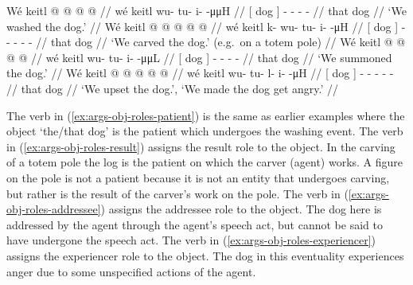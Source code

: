 \pex\label{exx:args-obj-roles}%
\a\label{ex:args-obj-roles-patient}%
%
\begingl
	\gla	{} Wé keitl {}  @ {} @ {} @ {} @ {} //
	\glb	{} wé keitl {} wu- tu- i-  -μμH //
	\glc	{}[  dog {}] - - -  - //
	\gld	{} that dog {}  {} {} {} {} //
	\glft	‘We washed the dog.’
		//
\endgl
\a\label{ex:args-obj-roles-result}%
%
\begingl
	\gla	{} Wé keitl {}  @ {} @ {} @ {} @ {} @ {} //
	\glb	{} wé keitl {} k- wu- tu- i-  -μH //
	\glc	{}[  dog {}] - - - -  - //
	\gld	{} that dog {}  {} {} {} {} {} //
	\glft	‘We carved the dog.’ (e.g.\ on a totem pole)
		//
\endgl
\a\label{ex:args-obj-roles-addressee}%
%
\begingl
	\gla	{} Wé keitl {}  @ {} @ {} @ {} @ {} //
	\glb	{} wé keitl {} wu- tu- i-  -μμL //
	\glc	{}[  dog {}] - - -  - //
	\gld	{} that dog {}  {} {} {} {} //
	\glft	‘We summoned the dog.’
		//
\endgl
\a\label{ex:args-obj-roles-experiencer}%
%
\begingl
	\gla	{} Wé keitl {}  @ {} @ {} @ {} @ {} @ {} //
	\glb	{} wé keitl {} wu- tu- l- i-  -μH //
	\glc	{}[  dog {}] - - - -  - //
	\gld	{} that dog {}  {} {} {} {} {} //
	\glft	‘We upset the dog.’, ‘We made the dog get angry.’
		//
\endgl
\xe

The verb in (\ref{ex:args-obj-roles-patient}) is the same as earlier examples where the object  ‘the/that dog’ is the patient which undergoes the washing event. The verb in (\ref{ex:args-obj-roles-result}) assigns the result role to the object. In the carving of a totem pole the log is the patient on which the carver (agent) works. A figure on the pole is not a patient because it is not an entity that undergoes carving, but rather is the result of the carver’s work on the pole. The verb in (\ref{ex:args-obj-roles-addressee}) assigns the addressee role to the object. The dog here is addressed by the agent through the agent’s speech act, but cannot be said to have undergone the speech act. The verb in (\ref{ex:args-obj-roles-experiencer}) assigns the experiencer role to the object. The dog in this eventuality experiences anger due to some unspecified actions of the agent.

